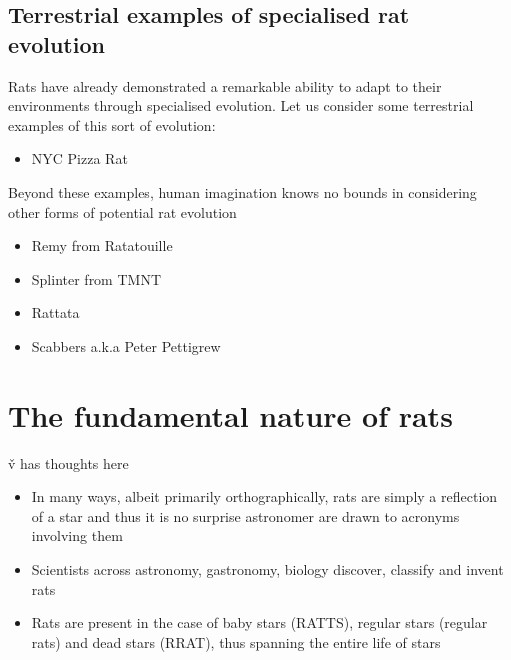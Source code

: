 \documentclass[twocolumn, twocolappendix]{aastex631}
\newcommand{\tauriRAT}{RATTS\xspace}
\newcommand{\radioRAT}{RRAT\xspace}
\begin{document}
\subsection{Terrestrial examples of specialised rat evolution}
Rats have already demonstrated a remarkable ability to adapt to their environments through specialised evolution. Let us consider some terrestrial examples of this sort of evolution:
\begin{itemize}
    \item NYC Pizza Rat
\end{itemize}
Beyond these examples, human imagination knows no bounds in considering other forms of potential rat evolution
\begin{itemize}
    \item Remy from Ratatouille
    \item Splinter from TMNT
    \item Rattata
    \item Scabbers a.k.a Peter Pettigrew
\end{itemize}


\section{The fundamental nature of rats}\label{sec:fundamental_rats}
\v{v has thoughts here}
\begin{itemize}
    \item In many ways, albeit primarily orthographically, rats are simply a reflection of a star and thus it is no surprise astronomer are drawn to acronyms involving them
    \item Scientists across astronomy, gastronomy, biology discover, classify and invent rats
    \item Rats are present in the case of baby stars (\tauriRAT), regular stars (regular rats) and dead stars (\radioRAT), thus spanning the entire life of stars
\end{itemize}
\end{document}
